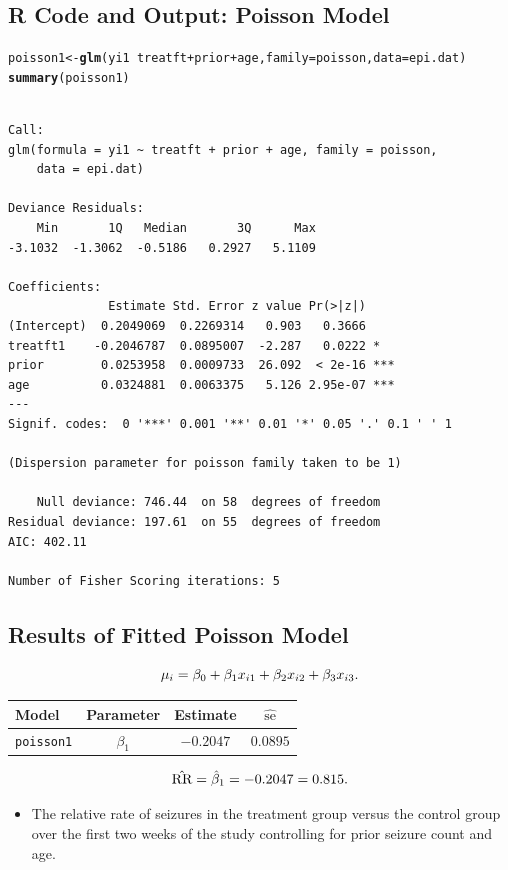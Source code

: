 \documentclass{article}\usepackage[]{graphicx}\usepackage[svgnames]{xcolor}
\makeatletter
\newcommand{\hlopt}[1]{\textcolor[rgb]{0,0,0}{#1}}%
\newcommand{\hlstd}[1]{\textcolor[rgb]{0.345,0.345,0.345}{#1}}%
\newcommand{\hlkwb}[1]{\textcolor[rgb]{0.69,0.353,0.396}{#1}}%
\newcommand{\hlkwc}[1]{\textcolor[rgb]{0.333,0.667,0.333}{#1}}%
\newcommand{\hlkwd}[1]{\textcolor[rgb]{0.737,0.353,0.396}{\textbf{#1}}}%
\newenvironment{kframe}{%
 \def\at@end@of@kframe{}%
 \ifinner\ifhmode%
  \def\at@end@of@kframe{\end{minipage}}%
  \begin{minipage}{\columnwidth}%
 \fi\fi%
 \def\FrameCommand##1{\hskip\@totalleftmargin \hskip-\fboxsep
 \colorbox{shadecolor}{##1}\hskip-\fboxsep
     \hskip-\linewidth \hskip-\@totalleftmargin \hskip\columnwidth}%
 \MakeFramed {\advance\hsize-\width
   \@totalleftmargin\z@ \linewidth\hsize
   \@setminipage}}%
 {\par\unskip\endMakeFramed%
 \at@end@of@kframe}
\newenvironment{knitrout}{}{} %
\let\exp\relax%
\let\log\relax%
\newcommand{\RR}{\text{RR}}%
\makeatother
\begin{document}
\subsection*{R Code and Output: Poisson Model}
\begin{knitrout}
\color{fgcolor}\begin{kframe}
\begin{alltt}
\hlstd{poisson1} \hlkwb{<-} \hlkwd{glm}\hlstd{(yi1} \hlopt{~} \hlstd{treatft} \hlopt{+} \hlstd{prior} \hlopt{+} \hlstd{age,} \hlkwc{family} \hlstd{= poisson,} \hlkwc{data} \hlstd{= epi.dat)}
\hlkwd{summary}\hlstd{(poisson1)}
\end{alltt}
\begin{verbatim}

Call:
glm(formula = yi1 ~ treatft + prior + age, family = poisson, 
    data = epi.dat)

Deviance Residuals: 
    Min       1Q   Median       3Q      Max  
-3.1032  -1.3062  -0.5186   0.2927   5.1109  

Coefficients:
              Estimate Std. Error z value Pr(>|z|)    
(Intercept)  0.2049069  0.2269314   0.903   0.3666    
treatft1    -0.2046787  0.0895007  -2.287   0.0222 *  
prior        0.0253958  0.0009733  26.092  < 2e-16 ***
age          0.0324881  0.0063375   5.126 2.95e-07 ***
---
Signif. codes:  0 '***' 0.001 '**' 0.01 '*' 0.05 '.' 0.1 ' ' 1

(Dispersion parameter for poisson family taken to be 1)

    Null deviance: 746.44  on 58  degrees of freedom
Residual deviance: 197.61  on 55  degrees of freedom
AIC: 402.11

Number of Fisher Scoring iterations: 5
\end{verbatim}
\end{kframe}
\end{knitrout}
\subsection*{Results of Fitted Poisson Model}
\[ \log{\mu_i}=\beta_0+\beta_1x_{i1}+\beta_2x_{i2}+\beta_3x_{i3}. \]
\begin{table}[H]
      \centering
      \begin{tabular}{lccc}
            Model             & Parameter   & Estimate    & $ \widehat{\text{se}} $ \\
            \midrule
            \texttt{poisson1} & $ \beta_1 $ & $ -0.2047 $ & $ 0.0895 $              \\
            \bottomrule
      \end{tabular}
\end{table}
\[ \hat{\RR}=\exp{\hat{\beta}_1}=\exp{-0.2047}=0.815. \]
\begin{itemize}
      \item The relative rate of seizures in the treatment group versus the control group over
            the first two weeks of the study controlling for prior seizure count and age.
\end{itemize}
\end{document}
